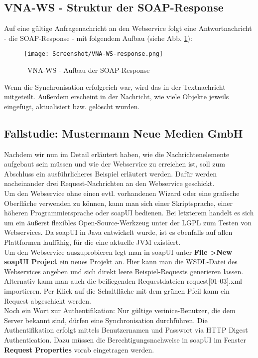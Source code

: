 \documentclass[a4paper,10pt]{book}
\begin{document}
\subsection{VNA-WS - Struktur der SOAP-Response}
Auf eine gültige Anfragenachricht an den Webservice folgt eine Antwortnachricht - die SOAP-Response - mit
folgendem Aufbau (siehe Abb. \ref{VNA-WS - Aufbau der SOAP-Response}):
\begin{figure}[htb!]
  \centering
  \texttt{[image: Screenshot/VNA-WS-response.png]}
  \caption{\label{VNA-WS - Aufbau der SOAP-Response} \ VNA-WS - Aufbau der SOAP-Response}
\end{figure}
\newline
Wenn die Synchronisation erfolgreich war, wird das in der Textnachricht mitgeteilt. Außerdem erscheint in der Nachricht, wie viele Objekte jeweils eingefügt, aktualisiert bzw. gelöscht wurden.

\subsection{ Fallstudie: Mustermann Neue Medien GmbH}
Nachdem wir nun im Detail erläutert haben, wie die Nachrichtenelemente aufgebaut sein müssen und wie der Webservice
zu erreichen ist, soll zum Abschluss ein ausführlicheres Beispiel erläutert werden. Dafür werden nacheinander drei
Request-Nachrichten an den Webservice geschickt.
\newline\\
Um den Webservice ohne einen evtl. vorhandenen Wizard oder eine grafische Oberfläche verwenden zu können, kann man
sich einer Skriptsprache, einer höheren Programmiersprache oder soapUI bedienen. Bei letzterem handelt es sich um ein äußerst flexibles Open-Source-Werkzeug unter der LGPL zum Testen von Webservices. Da soapUI in Java entwickelt wurde, ist es ebenfalls auf allen Plattformen lauffähig, für die eine aktuelle JVM existiert.
\newline\\
Um den Webservice auszuprobieren legt man in soapUI unter \textbf{File \textgreater New soapUI Project} ein
neues Projekt an. Hier kann man die WSDL-Datei des Webservices angeben und sich direkt leere Beispiel-Requests
generieren lassen. Alternativ kann man auch die beiliegenden Requestdateien request[01-03].xml importieren. Per Klick auf die Schaltfläche mit dem grünen Pfeil kann ein Request abgeschickt werden.
\newline\\
Noch ein Wort zur Authentifikation: Nur gültige verinice-Benutzer, die dem Server bekannt sind, dürfen eine
Synchronisation durchführen. Die Authentifikation erfolgt mittels Benutzernamen und Passwort via HTTP Digest
Authentication. Dazu müssen die Berechtigungsnachweise in soapUI im Fenster \textbf{Request Properties} vorab eingetragen
werden.
\end{document}
